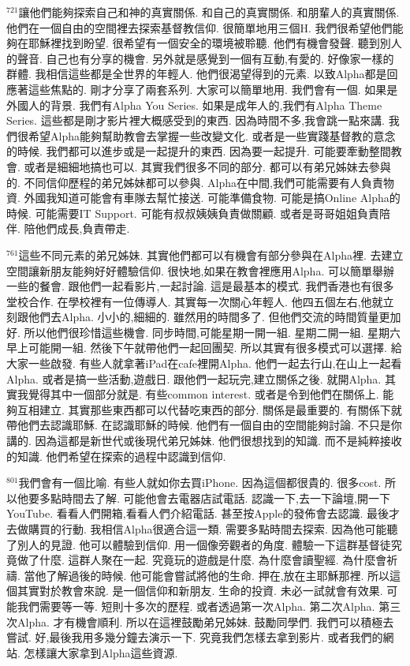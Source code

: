 \documentclass{book}
\begin{document}
$^{721}$讓他們能夠探索自己和神的真實關係.
和自己的真實關係.
和朋輩人的真實關係.
他們在一個自由的空間裡去探索基督教信仰.
很簡單地用三個H.
我們很希望他們能夠在耶穌裡找到盼望.
很希望有一個安全的環境被聆聽.
他們有機會發聲.
聽到別人的聲音.
自己也有分享的機會.
另外就是感覺到一個有互動,有愛的.
好像家一樣的群體.
我相信這些都是全世界的年輕人.
他們很渴望得到的元素.
以致Alpha都是回應著這些焦點的.
剛才分享了兩套系列.
大家可以簡單地用.
我們會有一個.
如果是外國人的背景.
我們有Alpha You Series.
如果是成年人的,我們有Alpha Theme Series.
這些都是剛才影片裡大概感受到的東西.
因為時間不多,我會跳一點來講.
我們很希望Alpha能夠幫助教會去掌握一些改變文化.
或者是一些實踐基督教的意念的時候.
我們都可以進步或是一起提升的東西.
因為要一起提升.
可能要牽動整間教會.
或者是細細地搞也可以.
其實我們很多不同的部分.
都可以有弟兄姊妹去參與的.
不同信仰歷程的弟兄姊妹都可以參與.
Alpha在中間,我們可能需要有人負責物資.
外國我知道可能會有車隊去幫忙接送.
可能準備食物.
可能是搞Online Alpha的時候.
可能需要IT Support.
可能有叔叔姨姨負責做關顧.
或者是哥哥姐姐負責陪伴.
陪他們成長,負責帶走.

$^{761}$這些不同元素的弟兄姊妹.
其實他們都可以有機會有部分參與在Alpha裡.
去建立空間讓新朋友能夠好好體驗信仰.
很快地,如果在教會裡應用Alpha.
可以簡單舉辦一些的餐會.
跟他們一起看影片,一起討論.
這是最基本的模式.
我們香港也有很多堂校合作.
在學校裡有一位傳導人.
其實每一次關心年輕人.
他四五個左右,他就立刻跟他們去Alpha.
小小的,細細的.
雖然用的時間多了.
但他們交流的時間質量更加好.
所以他們很珍惜這些機會.
同步時間,可能星期一開一組.
星期二開一組.
星期六早上可能開一組.
然後下午就帶他們一起回團契.
所以其實有很多模式可以選擇.
給大家一些啟發.
有些人就拿著iPad在cafe裡開Alpha.
他們一起去行山,在山上一起看Alpha.
或者是搞一些活動,遊戲日.
跟他們一起玩完,建立關係之後.
就開Alpha.
其實我覺得其中一個部分就是.
有些common interest.
或者是令到他們在關係上.
能夠互相建立.
其實那些東西都可以代替吃東西的部分.
關係是最重要的.
有關係下就帶他們去認識耶穌.
在認識耶穌的時候.
他們有一個自由的空間能夠討論.
不只是你講的.
因為這都是新世代或後現代弟兄姊妹.
他們很想找到的知識.
而不是純粹接收的知識.
他們希望在探索的過程中認識到信仰.

$^{801}$我們會有一個比喻.
有些人就如你去買iPhone.
因為這個都很貴的.
很多cost.
所以他要多點時間去了解.
可能他會去電器店試電話.
認識一下,去一下論壇,開一下YouTube.
看看人們開箱,看看人們介紹電話.
甚至按Apple的發佈會去認識.
最後才去做購買的行動.
我相信Alpha很適合這一類.
需要多點時間去探索.
因為他可能聽了別人的見證.
他可以體驗到信仰.
用一個像旁觀者的角度.
體驗一下這群基督徒究竟做了什麼.
這群人聚在一起.
究竟玩的遊戲是什麼.
為什麼會讀聖經.
為什麼會祈禱.
當他了解過後的時候.
他可能會嘗試將他的生命.
押在,放在主耶穌那裡.
所以這個其實對於教會來說.
是一個信仰和新朋友.
生命的投資.
未必一試就會有效果.
可能我們需要等一等.
短則十多次的歷程.
或者透過第一次Alpha.
第二次Alpha.
第三次Alpha.
才有機會順利.
所以在這裡鼓勵弟兄姊妹.
鼓勵同學們.
我們可以積極去嘗試.
好,最後我用多幾分鐘去演示一下.
究竟我們怎樣去拿到影片.
或者我們的網站.
怎樣讓大家拿到Alpha這些資源.
\end{document}
